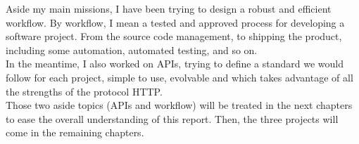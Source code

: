 \medskip

Aside my main missions, I have been trying to design a robust and efficient workflow. By workflow, I mean a tested and approved process for developing a software project. From the source code management, to shipping the product, including some automation, automated testing, and so on.\\
In the meantime, I also worked on APIs, trying to define a standard we would follow for each project, simple to use, evolvable and which takes advantage of all the strengths of the protocol HTTP.\\
Those two aside topics (APIs and workflow) will be treated in the next chapters to ease the overall understanding of this report. Then, the three projects will come in the remaining chapters.